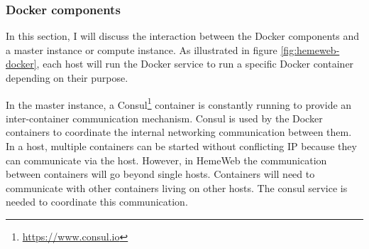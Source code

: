 \subsubsection{Docker components}

\vspace{1cm}

\noindent%
\begin{minipage}{\linewidth}%
\label{fig:hemeweb-docker}%
\end{minipage}

\vspace{1cm}

In this section, I will discuss the interaction between the Docker components and a master instance or compute instance. As illustrated in figure \ref{fig:hemeweb-docker}, each host will run the Docker service to run a specific Docker container depending on their purpose.

In the master instance, a Consul\footnote{\url{https://www.consul.io}}  container is constantly running to provide an inter-container communication mechanism. Consul is used by the Docker containers to coordinate the internal networking communication between them. In a host, multiple containers can be started without conflicting IP because they can communicate via the host. However, in HemeWeb the communication between containers will go beyond single hosts. Containers will need to communicate with other containers living on other hosts. The consul service is needed to coordinate this communication.

